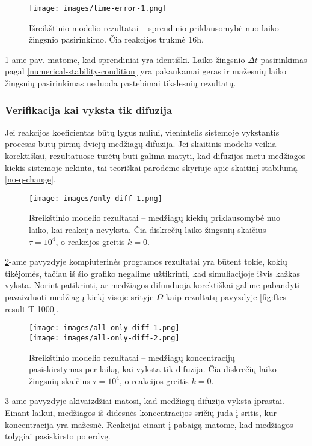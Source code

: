 \begin{figure}[h!]
  \centering
  \texttt{[image: images/time-error-1.png]}
  \caption{Išreikštinio modelio rezultatai -- sprendinio priklausomybė nuo laiko žingsnio pasirinkimo. Čia reakcijos trukmė 16h.}
\label{time-error}

\end{figure}

\ref{time-error}-ame pav. matome, kad sprendiniai yra identiški. Laiko žingsnio  $\Delta t$ pasirinkimas pagal \eqref{numerical-stability-condition} yra pakankamai geras ir mažesnių laiko žingsnių pasirinkimas neduoda pastebimai tikslesnių rezultatų.

\newpage
\subsubsection*{Verifikacija kai vyksta tik difuzija}

Jei reakcijos koeficientas būtų lygus nuliui, vienintelis sistemoje vykstantis procesas būtų pirmų dviejų medžiagų difuzija. Jei skaitinis modelis veikia korektiškai, rezultatuose turėtų būti galima matyti, kad difuzijos metu medžiagos kiekis sistemoje nekinta, tai teoriškai parodėme skyriuje apie skaitinį stabilumą \eqref{no-q-change}.

\begin{figure}[h!]
    \centering
    \texttt{[image: images/only-diff-1.png]}
    \caption{Išreikštinio modelio rezultatai -- medžiagų kiekių priklausomybė nuo laiko, kai reakcija nevyksta. Čia diskrečių laiko žingsnių skaičius $\tau=10^4$, o reakcijos greitis $k = 0$. }
    \label{no-reaction}
\end{figure}

\ref{no-reaction}-ame pavyzdyje kompiuterinės programos rezultatai yra būtent tokie, kokių tikėjomės, tačiau iš šio grafiko negalime užtikrinti, kad simuliacijoje išvis kažkas vyksta. Norint patikrinti, ar medžiagos difunduoja korektiškai galime pabandyti pavaizduoti medžiagų kiekį visoje srityje $\Omega$ kaip rezultatų pavyzdyje \eqref{fig:ftcs-result-T-1000}.

\begin{figure}[h!]
\centering
\texttt{[image: images/all-only-diff-1.png]} \\
\texttt{[image: images/all-only-diff-2.png]}

\caption{Išreikštinio modelio rezultatai -- medžiagų koncentracijų pasiskirstymas per laiką, kai vyksta tik difuzija. Čia diskrečių laiko žingsnių skaičius $\tau=10^4$, o reakcijos greitis $k = 0$. }

\label{only-diffusion}
\end{figure}

\ref{only-diffusion}-ame pavyzdyje akivaizdžiai matosi, kad medžiagų difuzija vyksta įprastai. Einant laikui, medžiagos iš didesnės koncentracijos sričių juda į sritis, kur koncentracija yra mažesnė. Reakcijai einant į pabaigą matome, kad medžiagos tolygiai pasiskirsto po erdvę.


